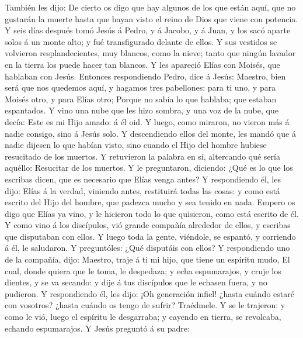  También les dijo: De cierto os digo que hay algunos de
los que están aquí, que no gustarán la muerte hasta que hayan visto el
reino de Dios que viene con potencia.  Y seis días después
tomó Jesús á Pedro, y á Jacobo, y á Juan, y los sacó aparte solos á un
monte alto; y fué transfigurado delante de ellos.  Y sus
vestidos se volvieron resplandecientes, muy blancos, como la nieve;
tanto que ningún lavador en la tierra los puede hacer tan blancos.
 Y les apareció Elías con Moisés, que hablaban con Jesús.
 Entonces respondiendo Pedro, dice á Jesús: Maestro, bien
será que nos quedemos aquí, y hagamos tres pabellones: para ti uno, y
para Moisés otro, y para Elías otro;  Porque no sabía lo
que hablaba; que estaban espantados.  Y vino una nube que
les hizo sombra, y una voz de la nube, que decía: Este es mi Hijo amado:
á él oid.  Y luego, como miraron, no vieron más á nadie
consigo, sino á Jesús solo.  Y descendiendo ellos del
monte, les mandó que á nadie dijesen lo que habían visto, sino cuando el
Hijo del hombre hubiese resucitado de los muertos.  Y
retuvieron la palabra en sí, altercando qué sería aquéllo: Resucitar de
los muertos.  Y le preguntaron, diciendo: ¿Qué es lo que
los escribas dicen, que es necesario que Elías venga antes?
 Y respondiendo él, les dijo: Elías á la verdad, viniendo
antes, restituirá todas las cosas: y como está escrito del Hijo del
hombre, que padezca mucho y sea tenido en nada.  Empero
os digo que Elías ya vino, y le hicieron todo lo que quisieron, como
está escrito de él.  Y como vino á los discípulos, vió
grande compañía alrededor de ellos, y escribas que disputaban con ellos.
 Y luego toda la gente, viéndole, se espantó, y corriendo
á él, le saludaron.  Y preguntóles: ¿Qué disputáis con
ellos?  Y respondiendo uno de la compañía, dijo: Maestro,
traje á ti mi hijo, que tiene un espíritu mudo,  El cual,
donde quiera que le toma, le despedaza; y echa espumarajos, y cruje los
dientes, y se va secando: y dije á tus discípulos que le echasen fuera,
y no pudieron.  Y respondiendo él, les dijo: ¡Oh
generación infiel! ¿hasta cuándo estaré con vosotros? ¿hasta cuándo os
tengo de sufrir? Traédmele.  Y se le trajeron: y como le
vió, luego el espíritu le desgarraba; y cayendo en tierra, se revolcaba,
echando espumarajos.  Y Jesús preguntó á su padre:
